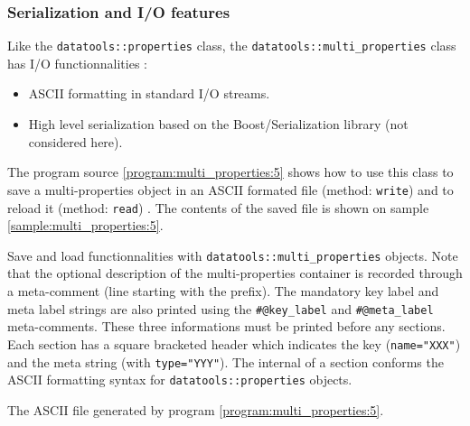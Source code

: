 \clearpage
\subsubsection{Serialization and I/O features}

Like    the     \texttt{datatools::properties}    class,    the
\texttt{datatools::multi\_properties}     class     has     I/O
functionnalities :

\begin{itemize}

\item ASCII formatting in standard I/O streams.

\item High level  serialization based on the Boost/Serialization library
(not considered here).

\end{itemize}


\pn The program source  \ref{program:multi_properties:5} shows how to use
this class to save a multi-properties object
in an ASCII formated file (method: \texttt{write}) and to reload it
(method: \texttt{read}) .
The contents of the saved file
is shown on sample \ref{sample:multi_properties:5}.


\begin{program}[h]
\caption{Save        and       load        functionnalities       with
  \texttt{datatools::multi\_properties} objects.  Note that the
  optional description  of the multi-properties  container is recorded
  through a  meta-comment (line starting  with the 
  prefix).  The  mandatory key label  and meta label strings  are also
  printed using the \texttt{\#@key\_label} and \texttt{\#@meta\_label}
  meta-comments.  These three informations  must be printed before any
  sections.   Each  section  has   a  square  bracketed  header  which
  indicates the  key (\texttt{name="XXX"})  and the meta  string (with
  \texttt{type="YYY"}). The  internal of a section  conforms the ASCII
  formatting syntax for \texttt{datatools::properties} objects.
}
\label{program:multi_properties:5}
\end{program}


\begin{sample}[h]
\caption{The ASCII file generated by program  \ref{program:multi_properties:5}.  }
\label{sample:multi_properties:5}
\end{sample}

